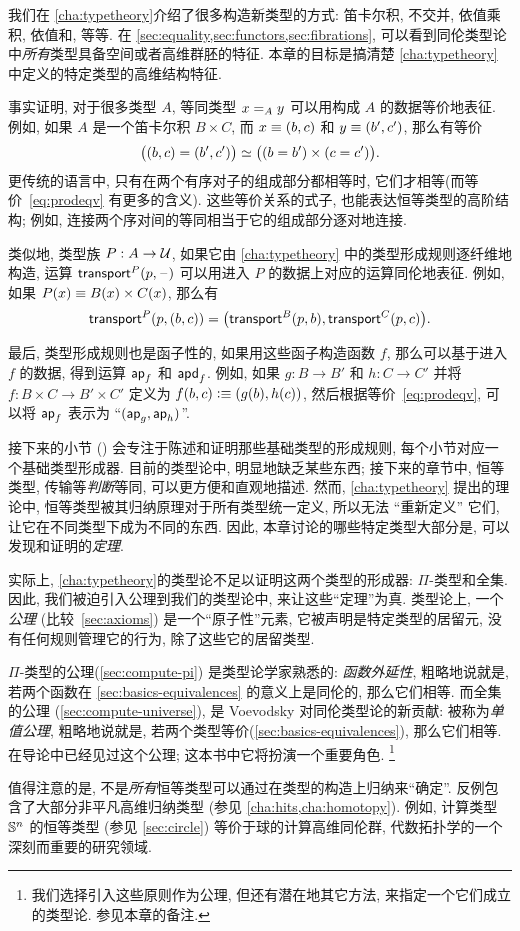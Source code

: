 我们在 \cref{cha:typetheory}介绍了很多构造新类型的方式: 笛卡尔积, 不交并, 依值乘积, 依值和, 等等.
在 \cref{sec:equality,sec:functors,sec:fibrations}, 可以看到同伦类型论中\emph{所有}类型具备空间或者高维群胚的特征.
本章的目标是搞清楚 \cref{cha:typetheory} 中定义的特定类型的高维结构特征.

事实证明, 对于很多类型 $A$, 等同类型 $\id[A]xy$ 可以用构成 $A$ 的数据等价地表征.
例如, 如果 $A$ 是一个笛卡尔积 $B\times C$, 而 $x\jdeq (b,c)$ 和 $y\jdeq(b',c')$, 那么有等价
\begin{equation}\label{eq:prodeqv}
  \eqv{\big((b,c)=(b',c')\big)}{\big((b=b')\times (c=c')\big)}.
\end{equation}
更传统的语言中, 只有在两个有序对子的组成部分都相等时, 它们才相等(而等价~\eqref{eq:prodeqv} 有更多的含义).
这些等价关系的式子, 也能表达恒等类型的高阶结构;
例如, 连接两个序对间的等同相当于它的组成部分逐对地连接.

类似地, 类型族 $P:A\to\type$, 如果它由 \cref{cha:typetheory} 中的类型形成规则逐纤维地构造, 运算 $\transfib{P}{p}{\blank}$ 可以用进入 $P$ 的数据上对应的运算同伦地表征.
例如, 如果 $P(x) \jdeq B(x)\times C(x)$, 那么有
\[\transfib{P}{p}{(b,c)} = \big(\transfib{B}{p}{b},\transfib{C}{p}{c}\big).\]

最后, 类型形成规则也是函子性的, 如果用这些函子构造函数 $f$, 那么可以基于进入 $f$ 的数据, 得到运算 $\apfunc f$ 和 $\apdfunc f$.
例如, 如果 $g:B\to B'$ 和 $h:C\to C'$ 并将 $f:B\times C \to B'\times C'$ 定义为 $f(b,c)\defeq (g(b),h(c))$, 然后根据等价~\eqref{eq:prodeqv}, 可以将 $\apfunc f$ 表示为 ``$(\apfunc g,\apfunc h)$''.

接下来的小节 () 会专注于陈述和证明那些基础类型的形成规则, 每个小节对应一个基础类型形成器.
目前的类型论中, 明显地缺乏某些东西;
接下来的章节中, 恒等类型, 传输等\emph{判断}等同, 可以更方便和直观地描述.
然而, \cref{cha:typetheory} 提出的理论中, 恒等类型被其归纳原理对于所有类型统一定义, 所以无法 ``重新定义'' 它们, 让它在不同类型下成为不同的东西.
因此, 本章讨论的哪些特定类型大部分是, 可以发现和证明的\emph{定理}.

实际上, \cref{cha:typetheory}的类型论不足以证明这两个类型的形成器: $\Pi$-类型和全集.
因此, 我们被迫引入公理到我们的类型论中, 来让这些``定理''为真.
类型论上, 一个\emph{公理} (比较~\cref{sec:axioms}) 是一个``原子性''元素, 它被声明是特定类型的居留元, 没有任何规则管理它的行为, 除了这些它的居留类型.
%

%
%
$\Pi$-类型的公理(\cref{sec:compute-pi}) 是类型论学家熟悉的: \emph{函数外延性}, 粗略地说就是, 若两个函数在 \cref{sec:basics-equivalences} 的意义上是同伦的, 那么它们相等.
而全集的公理 (\cref{sec:compute-universe}), 是 Voevodsky 对同伦类型论的新贡献: 被称为\emph{单值公理}, 粗略地说就是, 若两个类型等价(\cref{sec:basics-equivalences}), 那么它们相等.
在导论中已经见过这个公理; 这本书中它将扮演一个重要角色.%
\footnote{我们选择引入这些原则作为公理, 但还有潜在地其它方法, 来指定一个它们成立的类型论.
  参见本章的备注.}

值得注意的是, 不是\emph{所有}恒等类型可以通过在类型的构造上归纳来``确定''.
反例包含了大部分非平凡高维归纳类型 (参见 \cref{cha:hits,cha:homotopy}).
例如, 计算类型 $\Sn^n$ 的恒等类型 (参见 \cref{sec:circle}) 等价于球的计算高维同伦群, 代数拓扑学的一个深刻而重要的研究领域.